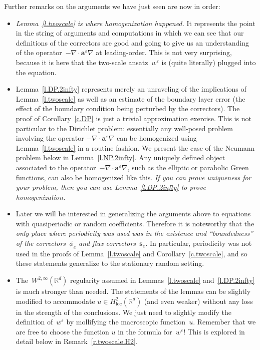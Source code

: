 \documentclass[11pt]{article} %
\numberwithin{equation}{section}
\theoremstyle{definition}
\newcommand*{\Rd}{\ensuremath{\mathbb{R}^d}}
\newcommand{\eps}{\varepsilon}
\newcommand{\s}{\mathbf{s}}
\newcommand{\ep}{\eps}
\renewcommand{\a}{\mathbf{a}}
\begin{document}
Further remarks on the arguments we have just seen are now in order:

\begin{itemize}

\item \emph{Lemma~\ref{l.twoscale} is where homogenization happened.} It represents the point in the string of arguments and computations in which we can see that our definitions of the correctors are good and going to give us an understanding of the operator~$-\nabla \cdot \a^\ep\nabla$ at leading-order. This is not very surprising, because it is here that the two-scale ansatz~$w^\ep$ is (quite literally) plugged into the equation. 

\item Lemma~\ref{l.DP.2infty} represents merely an unraveling of the implications of Lemma~\ref{l.twoscale} as well as an estimate of the boundary layer error (the effect of the boundary condition being perturbed by the correctors). The proof of Corollary~\ref{c.DP} is just a trivial approximation exercise. This is not particular to the Dirichlet problem: essentially any well-posed problem involving the operator $-\nabla \cdot \a^\ep \nabla$ can be homogenized using Lemma~\ref{l.twoscale} in a routine fashion. We present the case of the Neumann problem below in Lemma~\ref{l.NP.2infty}. Any uniquely defined object associated to the operator~$-\nabla \cdot \a^\ep \nabla$, such as the elliptic or parabolic Green functions, can also be homogenized like this. \emph{If you can prove uniqueness for your problem, then you can use Lemma~\ref{l.DP.2infty} to prove homogenization.}

\item 
Later we will be interested in generalizing the arguments above to equations with quasiperiodic or  random coefficients. Therefore it is noteworthy that the \emph{only place where periodicity was used was in the existence and ``boundedness'' of the correctors~$\phi_e$ and flux correctors~$\s_e$.} In particular, periodicity was not used in the proofs of Lemma~\ref{l.twoscale} and Corollary~\ref{c.twoscale}, and so these statements generalize to the stationary random setting. 


\item
The~$W^{2,\infty}(\Rd)$ regularity assumed in Lemmas~\ref{l.twoscale} and~\ref{l.DP.2infty} is much stronger than needed. The statements of the lemmas can be slightly modified to accommodate $u\in H^2_{\mathrm{loc}}(\Rd)$ (and even weaker) without any loss in the strength of the conclusions. We just need to slightly modify the definition of~$w^\ep$ by mollifying the macroscopic function~$u$. Remember that we are free to choose the function $u$ in the formula for~$w^\ep$! This is explored in detail below in Remark~\ref{r.twoscale.H2}.


\end{itemize}
\end{document}
